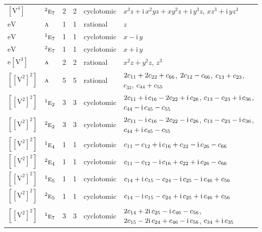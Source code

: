 \documentclass[10pt,a4paper]{article}
\numberwithin{equation}{section}
\newcommand{\irr}[1]{\text{\normalfont\scshape #1}}
\newcommand{\conjpair}[1]{{}^{#1}}
\newcommand{\iunit}{\mathrm{i}}
\newcommand{\jahn}[1]{\mathrm{#1}}
\newlength{\fillwidth}\newlength{\cellwidth}\newlength{\colwidth}
\newcommand{\signbreak}{\penalty100\relax}
\begin{document}
{\begin{longtable}{@{}llrrl>{\RaggedRight\arraybackslash}p{\fillwidth}@{}}
$\jahn{[V^{4}]}$ & $\conjpair{2}\irr{e}_{7}$ & 2 & 2 & cyclotomic & $x^{3}z + \iunit{}\,x^{2}yz + xy^{2}z + \iunit{}\,y^{3}z$, $xz^{3} + \iunit{}\,yz^{3}$\\
$\jahn{eV}$ & $\irr{a}$ & 1 & 1 & rational & $z$\\
$\jahn{eV}$ & $\conjpair{1}\irr{e}_{7}$ & 1 & 1 & cyclotomic & $x - \iunit{}\,y$\\
$\jahn{eV}$ & $\conjpair{2}\irr{e}_{7}$ & 1 & 1 & cyclotomic & $x + \iunit{}\,y$\\
$\jahn{e[V^{3}]}$ & $\irr{a}$ & 2 & 2 & rational & $x^{2}z + y^{2}z$, $z^{3}$\\
$\jahn{[[V^{2}]^{2}]}$ & $\irr{a}$ & 5 & 5 & rational & $2c_{11} +\signbreak 2c_{22} +\signbreak c_{66}$, $2c_{12} -\signbreak c_{66}$, $c_{13} +\signbreak c_{23}$, $c_{33}$, $c_{44} +\signbreak c_{55}$\\
$\jahn{[[V^{2}]^{2}]}$ & $\conjpair{1}\irr{e}_{2}$ & 3 & 3 & cyclotomic & $2c_{11} +\signbreak \iunit{}\,c_{16} -\signbreak 2c_{22} +\signbreak \iunit{}\,c_{26}$, $c_{13} -\signbreak c_{23} +\signbreak \iunit{}\,c_{36}$, $c_{44} -\signbreak \iunit{}\,c_{45} -\signbreak c_{55}$\\
$\jahn{[[V^{2}]^{2}]}$ & $\conjpair{2}\irr{e}_{2}$ & 3 & 3 & cyclotomic & $2c_{11} -\signbreak \iunit{}\,c_{16} -\signbreak 2c_{22} -\signbreak \iunit{}\,c_{26}$, $c_{13} -\signbreak c_{23} -\signbreak \iunit{}\,c_{36}$, $c_{44} +\signbreak \iunit{}\,c_{45} -\signbreak c_{55}$\\
$\jahn{[[V^{2}]^{2}]}$ & $\conjpair{1}\irr{e}_{4}$ & 1 & 1 & cyclotomic & $c_{11} -\signbreak c_{12} +\signbreak \iunit{}\,c_{16} +\signbreak c_{22} -\signbreak \iunit{}\,c_{26} -\signbreak c_{66}$\\
$\jahn{[[V^{2}]^{2}]}$ & $\conjpair{2}\irr{e}_{4}$ & 1 & 1 & cyclotomic & $c_{11} -\signbreak c_{12} -\signbreak \iunit{}\,c_{16} +\signbreak c_{22} +\signbreak \iunit{}\,c_{26} -\signbreak c_{66}$\\
$\jahn{[[V^{2}]^{2}]}$ & $\conjpair{1}\irr{e}_{5}$ & 1 & 1 & cyclotomic & $c_{14} +\signbreak \iunit{}\,c_{15} -\signbreak c_{24} -\signbreak \iunit{}\,c_{25} -\signbreak \iunit{}\,c_{46} +\signbreak c_{56}$\\
$\jahn{[[V^{2}]^{2}]}$ & $\conjpair{2}\irr{e}_{5}$ & 1 & 1 & cyclotomic & $c_{14} -\signbreak \iunit{}\,c_{15} -\signbreak c_{24} +\signbreak \iunit{}\,c_{25} +\signbreak \iunit{}\,c_{46} +\signbreak c_{56}$\\
$\jahn{[[V^{2}]^{2}]}$ & $\conjpair{1}\irr{e}_{7}$ & 3 & 3 & cyclotomic & $2c_{14} +\signbreak 2\iunit{}\,c_{25} -\signbreak \iunit{}\,c_{46} -\signbreak c_{56}$, $2c_{15} -\signbreak 2\iunit{}\,c_{24} +\signbreak c_{46} -\signbreak \iunit{}\,c_{56}$, $c_{34} +\signbreak \iunit{}\,c_{35}$\\

\end{longtable}}
\end{document}
